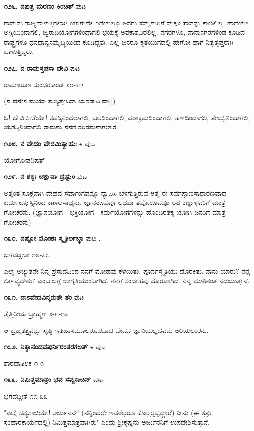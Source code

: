 {\medskip
\noindent\textbf{೧೨೬. ನಪುತ್ರ ಮರಣಂ ಕಿಂಚಿತ್} \hfill ಪುಟ \pageref{180}

ರಾಮನು ರಾಜ್ಯವಾಳುತ್ತಿರಲಾಗಿ ಯಾಗುದೇ ಎಡೆಯಲ್ಲೂ ಜನರು ತಮ್ಮೆದುರಿಗೆ ಮಕ್ಕಳ ಸಾವನ್ನು ಕಾಣಲಿಲ್ಲ. ಹಾಗೆಯೇ ಅಗ್ನಿಯಿಂದಾಗಲಿ, ಜ್ವರಾದಿಯೋಗಗಳಿಂದಾಗಲಿ ಭಯಕ್ಕೆ ಅವಕಾಶವಿರಲಿಲ್ಲ. ನಗರಗಳೂ, ನಾನಾನಗರಗಳಿಂಡ ಕೂಡಿದ ರಾಷ್ಟ್ರಗಳೂ ಧನಧಾನ್ಯಸಮೃದ್ಧಿಯಿಂದ ಕೂಡಿದ್ದವು. ಎಲ್ಲ ಜನರೂ ಕೃತಯುಗದಲ್ಲಿ ಹೇಗೋ ಹಾಗೆ ನಿತ್ಯತೃಪ್ತರಾಗಿ ಬಾಳುತ್ತಿದ್ದರು.

\medskip
\noindent\textbf{೧೨೭. ನ ರಾಮಸ್ತಪಸಾ ದೇವಿ} \hfill ಪುಟ \pageref{191}

\hfill ರಾಮಾಯಣ ಸುಂದರಕಾಂಡ ೨೦-೩೪

(ನ ಧನೇನ ಮಯಾ ತುಲ್ಯತ್ತೇಜಸಾ ಯಶಸಾಪಿ ವಾ||)

ಓ! ದೇವಿ ಸೀತೆಯೇ! ತಪಸ್ಸಿನಿಂದಲಾಗಲಿ, ಬಲದಿಂದಾಗಲಿ, ಪರಾಕ್ರಮದಿಂದಾಗಲಿ, ಹಣದಿಂದಾಗಲಿ, ತೇಜಸ್ಸಿನಿಂದಾಗಲಿ, ಯಶಸ್ಸಿನಿಂದಾಗಲಿ ರಾಮನು ನನಗೆ ಸರಿಸಮನಾಗಲಾರ. 

\medskip
\noindent\textbf{೧೨೮. ನ ವೇದಂ ವೇದಮಿತ್ಯಾಹುಃ}  $\star$ \hfill ಪುಟ \pageref{13}

\hfill ಯೋಗೋಪನಿಷತ್

\medskip
\noindent\textbf{೧೨೯. ನ ಶಕ್ಯಃ ಚಕ್ಷುಷಾ ದ್ರಷ್ಟುಂ} \hfill ಪುಟ \pageref{246}

ಅತ್ಯಂತ ಸೂಕ್ಷನಾಗಿ ದೇಹದ ಸರ್ವಾಂಗವನ್ನೂ ವ್ಯಾಪಿಸಿ ಬೆಳಗುತ್ತಿರುವ ಆತ್ಮ ಈ ಸರ್ವಪ್ರಾಣಿಸಾಧಾರಣವಾದ ಚರ್ಮಚಕ್ಷುಸ್ಸಿನಿಂದ ಕಾಣಲಸಾಧ್ಯನು. ಜ್ಞಾನರೂಪವೂ ಅಥವಾ ತಪೋರೂಪವೂ ಆದ ಕಣ್ಣುಳ್ಳವರಿಗೆ ಮಾತ್ರ ಗೋಚರನು. (ಜ್ಞಾನಯೋಗ - ಭಕ್ತಿಯೋಗ - ಕರ್ಮಯೋಗಗಳನ್ನು ಹೊಂದಿರತಕ್ಕ ಯೋಗಿ ಜನರಿಗೆ ಮಾತ್ರ ಗೋಚರನು)

\medskip
\noindent\textbf{೧೩೦. ನಷ್ಟೋ ಮೋಹಃ ಸ್ಮೃತಿರ್ಲಬ್ಧಾ} \hfill ಪುಟ \pageref{91},\label{104}

\hfill ಭಗವದ್ಗೀತಾ ೧೮-೭೩

ಎಲೈ ಅಚ್ಯುತನೇ ನಿನ್ನ ಪ್ರಸಾದದಿಂದ ನನಗೆ ಮೋಹವು ಕಳೆಯಿತು. ಪೂರ್ವಸ್ಮೃತಿಯು ದೊರಕಿತು. ನಾನು ಯಾರು? ನನ್ನ ಕರ್ತವ್ಯವೇನು? ಎಂಬ ಬಗ್ಗೆ ಜಾಗೃತಿಯುಂಟಾಗಿದೆ. ನನಗೆ ಸಂದೇಹವು ದೂರವಾಗಿದೆ. ನಿನ್ನ ಮಾತಿನಂತೆ ನಡೆಯುತ್ತೇನೆ.

\medskip
\noindent\textbf{೧೩೧. ನಾಽವೇದವಿನ್ಮನುತೇ ತಂ} \hfill ಪುಟ \pageref{106}

\hfill ತೈತ್ತಿರೀಯ ಬ್ರಾಹ್ಮಣ ೨-೯-೧೭

ಆ ಬ್ರಹ್ಮತತ್ತ್ವವನ್ನು ಸೃಷ್ಟಿ ಇತಿಹಾಸಮೂಲರೂಪವಾದ  ವೇದದ ಜ್ಞಾನಿಯಲ್ಲದವನು ಅರಿಯಲಾರನು.

\medskip
\noindent\textbf{೧೩೨. ನಿತ್ಯಾನಂದವಪುರ್ನಿರಂತರಗಲತ್} $\star$ \hfill ಪುಟ \pageref{31}

\hfill ಶಾರದಾತಿಲಕ ೧-೧

\medskip
\noindent\textbf{೧೩೩. ನಿಮಿತ್ತಮಾತ್ರಂ ಭವ ಸವ್ಯಸಾಚಿನ್} \hfill ಪುಟ \pageref{214a}

\hfill ಭಗವದ್ಗೀತೆ ೧೧-೩೩

"ಎಲೈ ಸವ್ಯಸಾಚಿಯೇ! ಅರ್ಜುನನೇ! (ನನ್ನಿಂದಲೇ ಇವರೆಲ್ಲರೂ ಕೊಲ್ಲಲ್ಪಟ್ಟಿದ್ದಾರೆ) ನೀನು (ಈ ಶತ್ರು ಸಂಹಾರಕಾರ್ಯದಲ್ಲಿ) ನಿಮಿತ್ತಮಾತ್ರವಾಗಿರು" ಎಂದು ಶ್ರೀಕೃಷ್ಣನು ಅರ್ಜುನನಿಗೆ ಉಪದೇಶಿಸುತ್ತಾನೆ.

}
